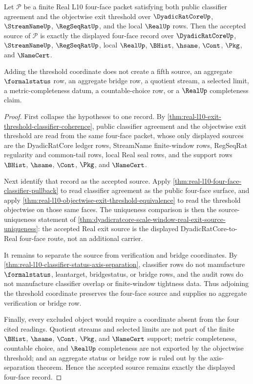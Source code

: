 \begin{theorem}
\label{thm:real-l10-classifier-threshold-source-conservativity}
Let $\mathcal P$ be a finite Real L10 four-face packet satisfying both public classifier agreement and the objectwise exit threshold over $\DyadicRatCoreUp$, $\StreamNameUp$, $\RegSeqRatUp$, and the local $\RealUp$ rows. Then the accepted source of $\mathcal P$ is exactly the displayed four-face record over $\DyadicRatCoreUp$, $\StreamNameUp$, $\RegSeqRatUp$, local $\RealUp$, $\BHist$, $\hsame$, $\Cont$, $\Pkg$, and $\NameCert$.

Adding the threshold coordinate does not create a fifth source, an aggregate $\formalstatus$ row, an aggregate bridge row, a quotient stream, a selected limit, a metric-completeness datum, a countable-choice row, or a $\RealUp$ completeness claim.
\end{theorem}
\begin{proof}
First collapse the hypotheses to one record. By \autoref{thm:real-l10-exit-threshold-classifier-coherence}, public classifier agreement and the objectwise exit threshold are read from the same four-face packet, whose only displayed sources are the DyadicRatCore ledger rows, StreamName finite-window rows, RegSeqRat regularity and common-tail rows, local Real seal rows, and the support rows $\BHist$, $\hsame$, $\Cont$, $\Pkg$, and $\NameCert$.

Next identify that record as the accepted source. Apply \autoref{thm:real-l10-four-face-classifier-pullback} to read classifier agreement as the public four-face surface, and apply \autoref{thm:real-l10-objectwise-exit-threshold-equivalence} to read the threshold objectwise on those same faces. The uniqueness comparison is then the source-uniqueness statement of \autoref{thm:dyadicratcore-scale-window-real-exit-source-uniqueness}: the accepted Real exit source is the displayed DyadicRatCore-to-Real four-face route, not an additional carrier.

It remains to separate the source from verification and bridge coordinates. By \autoref{thm:real-l10-classifier-status-axis-separation}, classifier rows do not manufacture $\formalstatus$, leantarget, bridgestatus, or bridge rows, and the audit rows do not manufacture classifier overlap or finite-window tightness data. Thus adjoining the threshold coordinate preserves the four-face source and supplies no aggregate verification or bridge row.

Finally, every excluded object would require a coordinate absent from the four cited readings. Quotient streams and selected limits are not part of the finite $\BHist$, $\hsame$, $\Cont$, $\Pkg$, and $\NameCert$ support; metric completeness, countable choice, and $\RealUp$ completeness are not exported by the objectwise threshold; and an aggregate status or bridge row is ruled out by the axis-separation theorem. Hence the accepted source remains exactly the displayed four-face record.
\end{proof}

